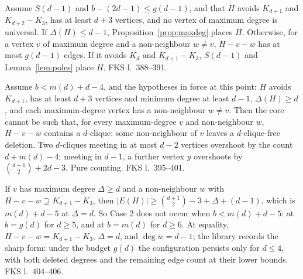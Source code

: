 \begin{lemma}
  \label{lem:branch-C-poles}
  \leanok
  Assume $S(d-1)$ and $b - (2d - 1) \le g(d-1)$, and that $H$ avoids $K_{d+1}$ and
  $K_{d+2} - K_3$, has at least $d + 3$ vertices, and no vertex of maximum degree is
  universal. If $\Delta(H) \le d - 1$, Proposition~\ref{prop:maxdeg} places $H$. Otherwise,
  for a vertex $v$ of maximum degree and a non-neighbour $w \ne v$, $H - v - w$ has at most
  $g(d-1)$ edges. If it avoids $K_d$ and $K_{d+1} - K_3$, $S(d-1)$ and Lemma~\ref{lem:poles}
  place $H$. FKS l.~388--391.
\end{lemma}

\begin{lemma}
  \label{lem:case1}
  \leanok
  Assume $b < m(d) + d - 4$, and the hypotheses in force at this point: $H$ avoids
  $K_{d+1}$, has at least $d + 3$ vertices and minimum degree at least $d - 1$,
  $\Delta(H) \ge d$, and each maximum-degree vertex has a non-neighbour $w \ne v$. Then the
  core cannot be such that, for every maximum-degree $v$ and non-neighbour $w$, $H - v - w$
  contains a $d$-clique: some non-neighbour of $v$ leaves a $d$-clique-free deletion. Two
  $d$-cliques meeting in at most $d - 2$ vertices overshoot by the count $d + m(d) - 4$;
  meeting in $d - 1$, a further vertex $y$ overshoots by $\binom{d+1}{2} + 2d - 3$. Pure
  counting. FKS l.~395--401.
\end{lemma}

\begin{lemma}
  \label{lem:case2-count}
  \leanok
  If $v$ has maximum degree $\Delta \ge d$ and a non-neighbour $w$ with
  $H - v - w \supseteq K_{d+1} - K_3$, then $\lvert E(H)\rvert \ge \binom{d+1}{2} - 3 +
  \Delta + (d - 1)$, which is $m(d) + d - 5$ at $\Delta = d$. So Case 2 does not occur when
  $b < m(d) + d - 5$: at $b = g(d)$ for $d \ge 5$, and at $b = m(d)$ for $d \ge 6$. At
  equality, $H - v - w = K_{d+1} - K_3$, $\Delta = d$, and $\deg w = d - 1$; the library
  records the sharp form: under the budget $g(d)$ the configuration persists only for
  $d \le 4$, with both deleted degrees and the remaining edge count at their lower bounds.
  FKS l.~404--406.
\end{lemma}

